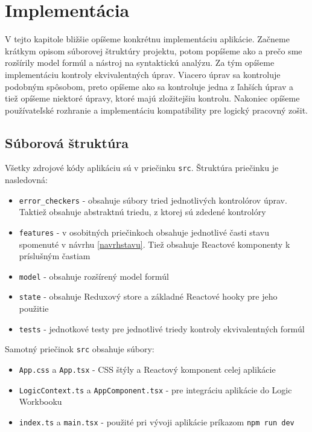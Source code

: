 \chapter{Implementácia}

V tejto kapitole bližšie opíšeme konkrétnu implementáciu aplikácie. Začneme krátkym opisom súborovej štruktúry projektu, potom popíšeme ako a prečo sme rozšírily model formúl a nástroj na syntaktickú analýzu. Za tým opíšeme implementáciu kontroly ekvivalentných úprav. Viacero úprav sa kontroluje podobným spôsobom, preto opíšeme ako sa kontroluje jedna z ľahších úprav a tiež opíšeme niektoré úpravy, ktoré majú zložitejšiu kontrolu. Nakoniec opíšeme používateľské rozhranie a implementáciu kompatibility pre logický pracovný zošit. 

\section{Súborová štruktúra}

Všetky zdrojové kódy aplikáciu sú v priečinku \texttt{src}. Štruktúra priečinku je nasledovná:

\begin{itemize}
\item  \texttt{error\_checkers} - obsahuje súbory tried jednotlivých kontrolórov úprav. Taktiež obsahuje abstraktnú triedu, z ktorej sú zdedené kontrolóry
\item  \texttt{features} - v osobitných priečinkoch obsahuje jednotlivé časti stavu spomenuté v návrhu \eqref{navrhstavu}. Tiež obsahuje Reactové komponenty k príslušným častiam
\item  \texttt{model} - obsahuje rozšírený model formúl
\item  \texttt{state} - obsahuje Reduxový store a základné Reactové hooky pre jeho použitie
\item  \texttt{tests} - jednotkové testy pre jednotlivé triedy kontroly ekvivalentných formúl
\end{itemize}

Samotný priečinok \texttt{src} obsahuje súbory:

\begin{itemize}
\item  \texttt{App.css} a \texttt{App.tsx} - CSS štýly a Reactový komponent celej aplikácie
\item  \texttt{LogicContext.ts} a \texttt{AppComponent.tsx} - pre integráciu aplikácie do Logic Workbooku
\item  \texttt{index.ts} a \texttt{main.tsx} - použité pri vývoji aplikácie príkazom \texttt{npm run dev}
\end{itemize}

